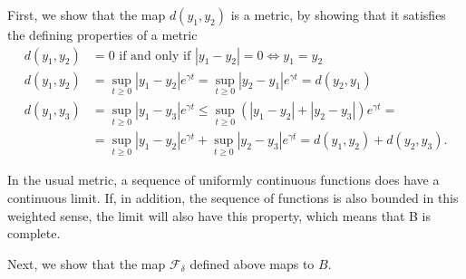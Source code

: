 \documentclass[a4paper,11pt,pdftex]{article}
\begin{document}
First, we show that the map $d(y_1, y_2)$ is a metric, by showing that it satisfies the defining properties of a metric
\begin{align*}
    d(y_1, y_2) &= 0 \text{ if and only if } |y_1-y_2|=0 \Longleftrightarrow y_1=y_2 \\
    d(y_1, y_2) &= \sup_{t\geq 0} |y_1 - y_2|e^{\gamma t} = \sup_{t\geq 0} |y_2 - y_1|e^{\gamma t} = d(y_2, y_1) \\
    d(y_1, y_3) &= \sup_{t\geq 0} |y_1 - y_3|e^{\gamma t} \leq  \sup_{t\geq 0} (|y_1 - y_2| + |y_2 - y_3|)e^{\gamma t}= \\ &= \sup_{t\geq 0} |y_1 - y_2|e^{\gamma t} + \sup_{t\geq 0}  |y_2 - y_3|e^{\gamma t} = d(y_1,y_2) + d(y_2, y_3).
\end{align*}

In the usual metric, a sequence of uniformly continuous functions does have a continuous limit. If, in addition, the sequence of functions is also bounded in this weighted sense, the limit will also have this property, which means that B is complete. 

Next, we show that the map $\mathcal{F}_\delta$ defined above maps to 
$B$. 
\end{document}
